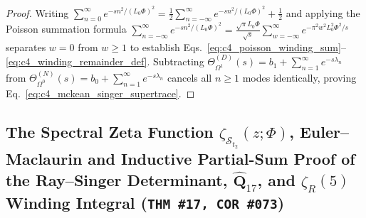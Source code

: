 \documentclass[11pt,a4paper]{article}
\theoremstyle{definition}
\theoremstyle{plain}
\theoremstyle{remark}
\begin{document}
\begin{proof}
Writing $\sum_{n=0}^\infty e^{-s n^2/(L_0\Phi)^2} = \frac{1}{2}\sum_{n=-\infty}^\infty e^{-s n^2/(L_0\Phi)^2} + \frac{1}{2}$ and applying the Poisson summation formula $\sum_{n=-\infty}^\infty e^{-s n^2/(L_0\Phi)^2} = \frac{\sqrt{\pi}L_0\Phi}{\sqrt{s}}\sum_{w=-\infty}^\infty e^{-\pi^2 w^2 L_0^2\Phi^2/s}$ separates $w = 0$ from $w \ge 1$ to establish Eqs.~\eqref{eq:c4_poisson_winding_sum}--\eqref{eq:c4_winding_remainder_def}. Subtracting $\Theta_{\Omega^1}^{(D)}(s) = b_1 + \sum_{n=1}^\infty e^{-s\lambda_n}$ from $\Theta_{\Omega^0}^{(N)}(s) = b_0 + \sum_{n=1}^\infty e^{-s\lambda_n}$ cancels all $n \ge 1$ modes identically, proving Eq.~\eqref{eq:c4_mckean_singer_supertrace}.
\end{proof}

\subsection{\texorpdfstring{The Spectral Zeta Function $\zeta_{\mathcal{S}_{t_2}}(z; \Phi)$, Euler--Maclaurin and Inductive Partial-Sum Proof of the Ray--Singer Determinant, $\widehat{\mathbf{Q}}_{17}$, and $\zeta_R(5)$ Winding Integral (\texttt{THM~\#17, COR~\#073})}{The Spectral Zeta Function, Euler-Maclaurin Proof of the Ray-Singer Determinant, Q\_17, and zeta\_R(5) Winding Integral}}
\end{document}
